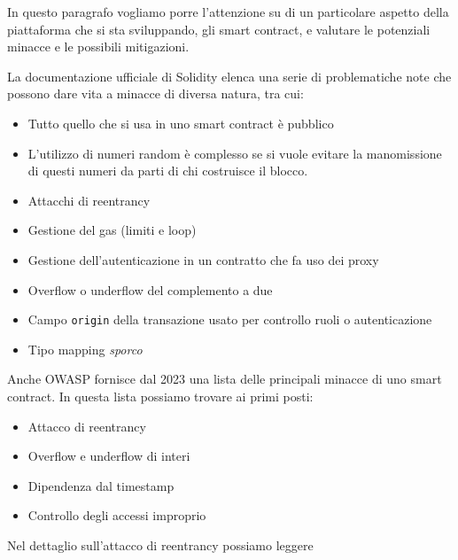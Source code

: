 \documentclass[a4paper,11pt]{article}
\begin{document}
In questo paragrafo vogliamo porre l'attenzione su di un particolare aspetto della piattaforma che si sta sviluppando, gli smart contract, e valutare le potenziali minacce e le possibili mitigazioni.

La documentazione ufficiale di Solidity elenca una serie di problematiche note \cite{soliditylangSolidityx2014} che possono dare vita a minacce di diversa natura, tra cui:

\begin{itemize}
    \item Tutto quello che si usa in uno smart contract è pubblico
    \item L'utilizzo di numeri random è complesso se si vuole evitare la manomissione di questi numeri da parti di chi costruisce il blocco.
    \item Attacchi di reentrancy
    \item Gestione del gas (limiti e loop)
    \item Gestione dell'autenticazione in un contratto che fa uso dei proxy
    \item Overflow o underflow del complemento a due
    \item Campo \texttt{origin} della transazione usato per controllo ruoli o autenticazione
    \item Tipo mapping \textit{sporco}
\end{itemize}

Anche OWASP fornisce dal 2023 una lista \cite{owaspOWASPSmart} delle principali minacce di uno smart contract. In questa lista possiamo trovare ai primi posti:

\begin{itemize}
    \item Attacco di reentrancy
    \item Overflow e underflow di interi
    \item Dipendenza dal timestamp
    \item Controllo degli accessi improprio
\end{itemize}

Nel dettaglio sull'attacco di reentrancy possiamo leggere  \cite{owaspOWASPSmart}
\end{document}
